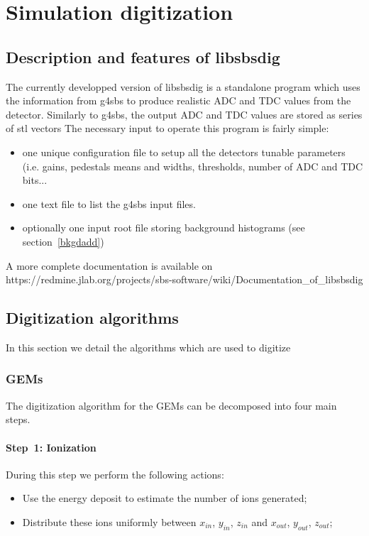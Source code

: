 \section{Simulation digitization}

\subsection{Description and features of libsbsdig}

The currently developped version of libsbsdig is a standalone program which uses the information from g4sbs to produce realistic ADC and TDC values from the detector.
Similarly to g4sbs, the output ADC and TDC values are stored as series of stl vectors
The necessary input to operate this program is fairly simple:
%
\begin{itemize}
\item{one unique configuration file to setup all the detectors tunable parameters (i.e. gains, pedestals means and widths, thresholds, number of ADC and TDC bits...}
\item{one text file to list the g4sbs input files.}
\item{optionally one input root file storing background histograms (see section~\ref{bkgdadd})}
\end{itemize}
%
A more complete documentation is available on\\
{https://redmine.jlab.org/projects/sbs-software/wiki/Documentation\_of\_libsbsdig}

\subsection{Digitization algorithms}
\label{digalgo}

In this section we detail the algorithms which are used to digitize

\subsubsection{GEMs}

The digitization algorithm for the GEMs can be decomposed into four main steps.
%
\paragraph{Step~1: Ionization}
During this step we perform the following actions:
%
\begin{itemize}
\item{Use the energy deposit to estimate the number of ions generated;}
\item{Distribute these ions uniformly between $x_{in}$, $y_{in}$, $z_{in}$ and $x_{out}$, $y_{out}$, $z_{out}$;}
\end{itemize}
%
